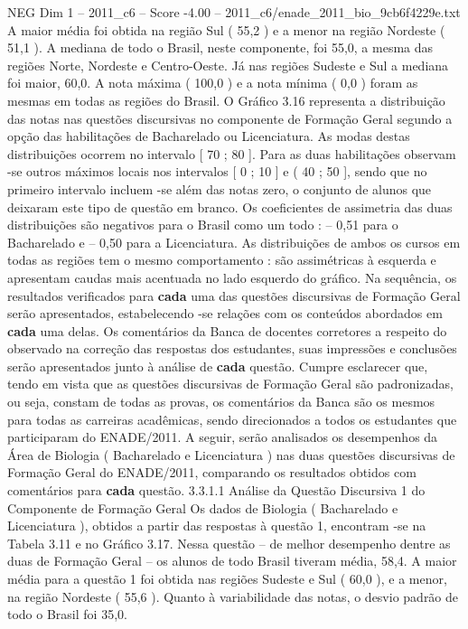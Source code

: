 \begin{textsample}{NEG Dim 1 – 2011\_c6 – Score -4.00 – 2011\_c6/enade\_2011\_bio\_9cb6f4229e.txt}
A maior média foi obtida na região Sul ( 55,2 ) e a menor na região Nordeste ( 51,1 ).
A mediana de todo o Brasil, neste componente, foi 55,0, a mesma das regiões Norte, Nordeste e Centro-Oeste.
Já nas regiões Sudeste e Sul a mediana foi maior, 60,0.
A nota máxima ( 100,0 ) e a nota mínima ( 0,0 ) foram as mesmas em todas as regiões do Brasil.
O Gráfico 3.16 representa a distribuição das notas nas questões discursivas no componente de Formação Geral segundo a opção das habilitações de Bacharelado ou Licenciatura.
As modas destas distribuições ocorrem no intervalo [ 70 ; 80 ].
Para as duas habilitações observam -se outros máximos locais nos intervalos [ 0 ; 10 ] e ( 40 ; 50 ], sendo que no primeiro intervalo incluem -se além das notas zero, o conjunto de alunos que deixaram este tipo de questão em branco.
Os coeficientes de assimetria das duas distribuições são negativos para o Brasil como um todo : – 0,51 para o Bacharelado e – 0,50 para a Licenciatura.
As distribuições de ambos os cursos em todas as regiões tem o mesmo comportamento : são assimétricas à esquerda e apresentam caudas mais acentuada no lado esquerdo do gráfico.
Na sequência, os resultados verificados para \textbf{cada} uma das questões discursivas de Formação Geral serão apresentados, estabelecendo -se relações com os conteúdos abordados em \textbf{cada} uma delas.
Os comentários da Banca de docentes corretores a respeito do observado na correção das respostas dos estudantes, suas impressões e conclusões serão apresentados junto à análise de \textbf{cada} questão.
Cumpre esclarecer que, tendo em vista que as questões discursivas de Formação Geral são padronizadas, ou seja, constam de todas as provas, os comentários da Banca são os mesmos para todas as carreiras acadêmicas, sendo direcionados a todos os estudantes que participaram do ENADE/2011.
A seguir, serão analisados os desempenhos da Área de Biologia ( Bacharelado e Licenciatura ) nas duas questões discursivas de Formação Geral do ENADE/2011, comparando os resultados obtidos com comentários para \textbf{cada} questão. 3.3.1.1 Análise da Questão Discursiva 1 do Componente de Formação Geral Os dados de Biologia ( Bacharelado e Licenciatura ), obtidos a partir das respostas à questão 1, encontram -se na Tabela 3.11 e no Gráfico 3.17.
Nessa questão – de melhor desempenho dentre as duas de Formação Geral – os alunos de todo Brasil tiveram média, 58,4.
A maior média para a questão 1 foi obtida nas regiões Sudeste e Sul ( 60,0 ), e a menor, na região Nordeste ( 55,6 ).
Quanto à variabilidade das notas, o desvio padrão de todo o Brasil foi 35,0.

\end{textsample}
